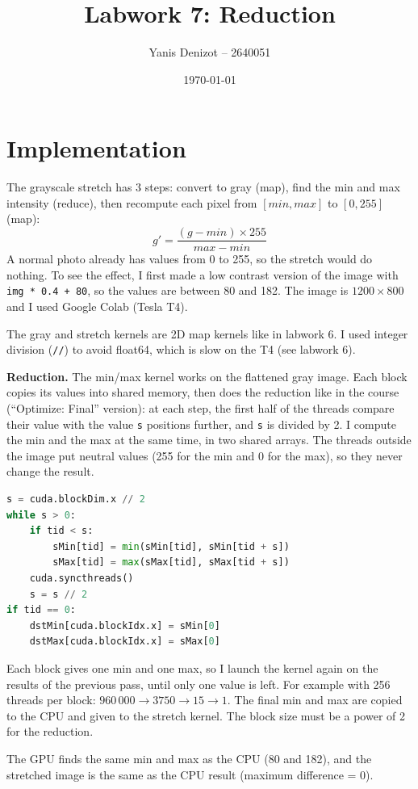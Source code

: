 \documentclass[11pt,a4paper]{article}
\title{Labwork 7: Reduction}
\author{Yanis Denizot -- 2640051}
\date{\today}
\begin{document}
\maketitle

\section{Implementation}
The grayscale stretch has 3 steps: convert to gray (map), find the min and max intensity
(reduce), then recompute each pixel from $[min, max]$ to $[0, 255]$ (map):
\[
g' = \frac{(g - min) \times 255}{max - min}
\]
A normal photo already has values from 0 to 255, so the stretch would do nothing. To see the
effect, I first made a low contrast version of the image with \texttt{img * 0.4 + 80}, so the
values are between 80 and 182. The image is $1200 \times 800$ and I used Google Colab (Tesla T4).

The gray and stretch kernels are 2D map kernels like in labwork 6. I used integer division
(\texttt{//}) to avoid float64, which is slow on the T4 (see labwork 6).

\textbf{Reduction.} The min/max kernel works on the flattened gray image. Each block copies its
values into shared memory, then does the reduction like in the course (``Optimize: Final''
version): at each step, the first half of the threads compare their value with the value
\texttt{s} positions further, and \texttt{s} is divided by 2. I compute the min and the max at
the same time, in two shared arrays. The threads outside the image put neutral values (255 for
the min and 0 for the max), so they never change the result.

\begin{lstlisting}[language=Python]
s = cuda.blockDim.x // 2
while s > 0:
    if tid < s:
        sMin[tid] = min(sMin[tid], sMin[tid + s])
        sMax[tid] = max(sMax[tid], sMax[tid + s])
    cuda.syncthreads()
    s = s // 2
if tid == 0:
    dstMin[cuda.blockIdx.x] = sMin[0]
    dstMax[cuda.blockIdx.x] = sMax[0]
\end{lstlisting}

Each block gives one min and one max, so I launch the kernel again on the results of the
previous pass, until only one value is left. For example with 256 threads per block:
$960\,000 \rightarrow 3750 \rightarrow 15 \rightarrow 1$. The final min and max are copied
to the CPU and given to the stretch kernel. The block size must be a power of 2 for the
reduction.

The GPU finds the same min and max as the CPU (80 and 182), and the stretched image is the
same as the CPU result (maximum difference = 0).
\end{document}
